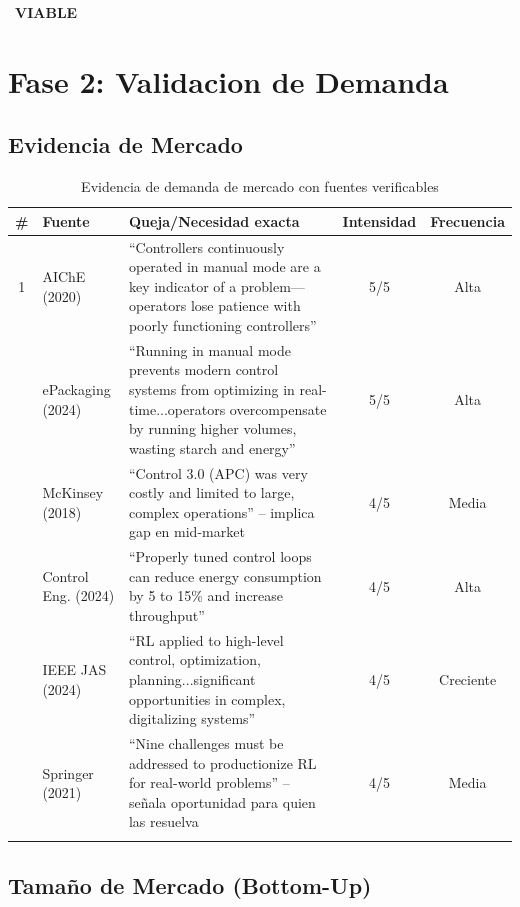 \documentclass[11pt,a4paper]{article}
\newcommand{\semverde}{\textcolor{verde}{\ding{108}}}
\begin{document}
\begin{veredictobox}
\centering
\semverde\ \textbf{VIABLE}
\end{veredictobox}

\newpage
\section{Fase 2: Validacion de Demanda}

\subsection{Evidencia de Mercado}

\begin{longtable}{c p{2cm} p{5cm} c c}
\toprule
\textbf{\#} & \textbf{Fuente} & \textbf{Queja/Necesidad exacta} & \textbf{Intensidad} & \textbf{Frecuencia} \\
\midrule
\endhead
1 & AIChE (2020) & ``Controllers continuously operated in manual mode are a key indicator of a problem---operators lose patience with poorly functioning controllers'' & 5/5 & Alta \\
\addlinespace
2 & ePackaging (2024) & ``Running in manual mode prevents modern control systems from optimizing in real-time...operators overcompensate by running higher volumes, wasting starch and energy'' & 5/5 & Alta \\
\addlinespace
3 & McKinsey (2018) & ``Control 3.0 (APC) was very costly and limited to large, complex operations'' -- implica gap en mid-market & 4/5 & Media \\
\addlinespace
4 & Control Eng. (2024) & ``Properly tuned control loops can reduce energy consumption by 5 to 15\% and increase throughput'' & 4/5 & Alta \\
\addlinespace
5 & IEEE JAS (2024) & ``RL applied to high-level control, optimization, planning...significant opportunities in complex, digitalizing systems'' & 4/5 & Creciente \\
\addlinespace
6 & Springer (2021) & ``Nine challenges must be addressed to productionize RL for real-world problems'' -- señala oportunidad para quien las resuelva & 4/5 & Media \\
\bottomrule
\caption{Evidencia de demanda de mercado con fuentes verificables}
\end{longtable}

\subsection{Tamaño de Mercado (Bottom-Up)}
\end{document}
